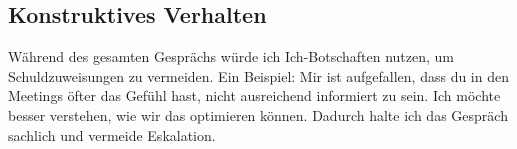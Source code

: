 \subsection{Konstruktives Verhalten}
Während des gesamten Gesprächs würde ich \glqq Ich-Botschaften\grqq{} nutzen, um Schuldzuweisungen zu vermeiden. Ein Beispiel: \glqq Mir ist aufgefallen, dass du in den Meetings öfter das Gefühl hast, nicht ausreichend informiert zu sein. Ich möchte besser verstehen, wie wir das optimieren können.\grqq{} Dadurch halte ich das Gespräch sachlich und vermeide Eskalation.

